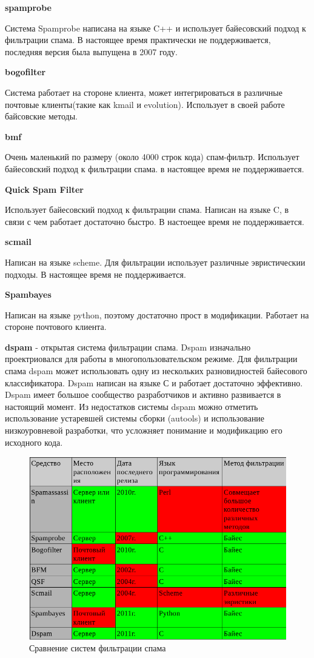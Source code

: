 \textbf{spamprobe}

Система Spamprobe написана на языке C++ и использует байесовский подход к фильтрации спама. В настоящее время практически не поддерживается, последняя версия была выпущена в 2007 году.

\textbf{bogofilter}

Система работает на стороне клиента, может интегрироваться в различные почтовые клиенты(такие как kmail и evolution). Использует в своей работе байсовские методы.

\textbf{bmf}

Очень маленький по размеру (около 4000 строк кода) спам-фильтр. Использует байесовский подход к фильтрации спама. в настоящее время не поддерживается.

\textbf{Quick Spam Filter}

Использует байесовский подход к фильтрации спама. Написан на языке C, в связи с чем работает достаточно быстро. В настоещее время не поддерживается.

\textbf{scmail}

Написан на языке scheme. Для фильтрации использует различные эвристическии подходы. В настоящее время не поддерживается.

\textbf{Spambayes}

Написан на языке python, поэтому достаточно прост в модификации. Работает на стороне почтового клиента.

\textbf{dspam} - открытая система фильтрации спама. Dspam изначально проектриовался для работы в многопользовательском режиме.
Для фильтрации спама dspam может использовать одну из нескольких разновидностей байесового классификатора.
Dspam написан на языке С и работает достаточно эффективно. Dspam имеет большое сообщество разработчиков и активно развивается в настоящий момент.
Из недостатков системы dspam можно отметить использование устаревшей системы сборки (autools) и использование низкоуровневой разработки, что усложняет понимание и модификацию его исходного кода.
\begin{figure}[h]
\begin{center}
\includegraphics[width=13cm]{img/compare}
\end{center}
\caption{Сравнение систем фильтрации спама}
\label{spam_systems}
\end{figure}


